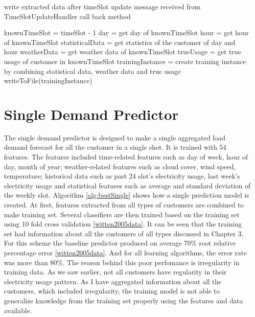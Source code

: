 \begin{algorithm} [!h]
\caption{write extracted data after timeSlot update message received from TimeSlotUpdateHandler call back method}
\begin{algorithmic} [1]
\STATE knownTimeSlot = timeSlot - 1
\STATE day = get day of knownTimeSlot
\STATE hour = get hour of knownTimeSlot
\STATE statisticalData = get statistics of the customer of day and hour
\STATE weatherData = get weather data of knownTimeSlot
\STATE trueUsage = get true usage of customer in knownTimeSlot
\STATE trainingInstance = create training instance by combining statistical data, weather data and true usage 
\STATE writeToFile(trainingInstance)
\ENDFOR
\end{algorithmic}
\label{alg:writeSlotInfo}
\end{algorithm}

\section{Single Demand Predictor}
The single demand predictor is designed to make a single aggregated load demand forecast for all the customer in a single shot. It is trained with 54 features. The features included time-related features such as day of week, hour of day, month of year; weather-related features such as cloud cover, wind speed, temperature; historical data such as past 24 slot's electricity usage, last week's electricity usage and statistical features such as average and standard deviation of the weekly slot. Algorithm \ref{alg:bestSingle} shows how a single prediction model is created. At first, features extracted from all types of customers are combined to make training set. Several classifiers are then trained based on the training set using 10 fold cross validation \ref{witten2005data}. It can be seen that the training set had information about all the customers of all types discussed in Chapter 3. For this scheme the baseline predictor produced on average 70\% root relative percentage error \ref{witten2005data}. And for all learning algorithms, the error rate was more than 80\%. The reason behind this poor perfomance is irregularity in training data. As we saw earlier, not all customers have regularity in their electricity usage pattern. As I have aggregated information about all the customers, which included irregularity, the training model is not able to generalize knowledge from the training set properly using the features and data available. 



